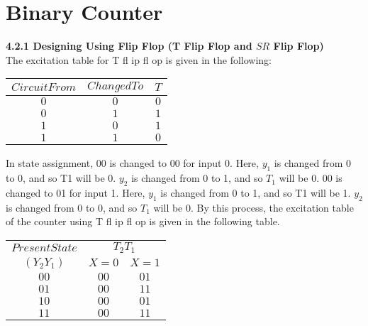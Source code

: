 \documentclass{article}
\begin{document}
\section*{Binary Counter}

\vspace*{0.5cm}
\textbf{4.2.1 Designing Using Flip Flop (T Flip Flop and $SR$ Flip Flop)}\\

\vspace*{0.2cm}
The excitation table for T fl ip fl op is given in the following:

\begin{center}
\begin{tabular}{ccc}
 \hline

 \hline

 \hline

 \hline
 $Circuit From$ &  $Changed To$ & $T$\\
\hline
 $0$    &    $0$    &   $0$  \\
 $0$    &    $1$    &   $1$  \\
 $1$    &    $0$    &   $1$  \\
 $1$    &    $1$    &   $0$  \\
 \hline

 \hline

 \hline

 \hline
\end{tabular}
\end{center}

\hspace*{0.2cm} In state assignment, 00 is changed to 00 for input 0. Here, $y_1$ is changed from 0 to 0, and so T1 will be 0.
$y_2$ is changed from 0 to 1, and so $T_1$ will be 0. 00 is changed to 01 for input 1. Here, $y_1$ is changed from 0
to 1, and so T1 will be 1. $y_2$ is changed from 0 to 0, and so $T_1$ will be 0. By this process, the excitation table
of the counter using T fl ip fl op is given in the following table.\\

\vspace*{0.1cm}
\begin{center}
\begin{tabular}{ccc}
 \hline

 \hline

 \hline

 \hline
$Present State$ & \multicolumn{2}{c}{$T_2T_1$}\\
 \cline{2-3}
 $(Y_2Y_1)$ &  $X=0$ & $X=1$\\
\hline
 $00$    &    $00$    &   $01$  \\
 $01$    &    $00$    &   $11$  \\
 $10$    &    $00$    &   $01$  \\
 $11$    &    $00$    &   $11$  \\

 \hline

 \hline

 \hline

 \hline
\end{tabular}
\end{center}
\end{document}
